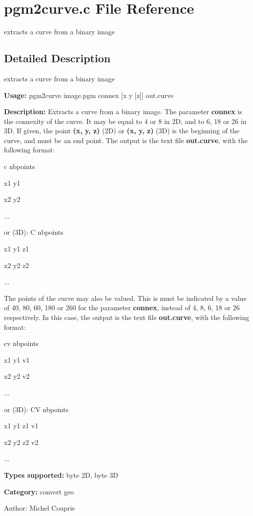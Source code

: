 \section{pgm2curve.c File Reference}
\label{pgm2curve_8c}
extracts a curve from a binary image 



\subsection{Detailed Description}
extracts a curve from a binary image 

{\bf Usage:} pgm2curve image.pgm connex [x y [z]] out.curve

{\bf Description:} Extracts a curve from a binary image. The parameter {\bf connex} is the connexity of the curve. It may be equal to 4 or 8 in 2D, and to 6, 18 or 26 in 3D. If given, the point {\bf (x, y, z)} (2D) or {\bf (x, y, z)} (3D) is the beginning of the curve, and must be an end point. The output is the text file {\bf out.curve}, with the following format:\par
 c nbpoints\par
 x1 y1\par
 x2 y2\par
 ...\par
 or (3D): C nbpoints\par
 x1 y1 z1\par
 x2 y2 z2\par
 ...\par


The points of the curve may also be valued. This is must be indicated by a value of 40, 80, 60, 180 or 260 for the parameter {\bf connex}, instead of 4, 8, 6, 18 or 26 respectively. In this case, the output is the text file {\bf out.curve}, with the following format:\par
 cv nbpoints\par
 x1 y1 v1\par
 x2 y2 v2\par
 ...\par
 or (3D): CV nbpoints\par
 x1 y1 z1 v1\par
 x2 y2 z2 v2\par
 ...\par


{\bf Types supported:} byte 2D, byte 3D

{\bf Category:} convert geo

\begin{Desc}
\item[Author:]Michel Couprie \end{Desc}
